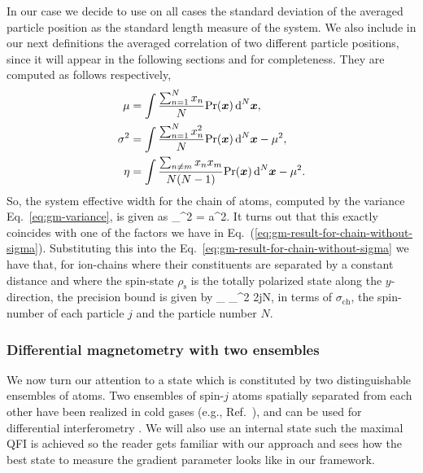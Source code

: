 In our case we decide to use on all cases the standard deviation of the averaged particle position as the standard length measure of the system.
We also include in our next definitions the averaged correlation of two different particle positions, since it will appear in the following sections and for completeness.
They are computed as follows respectively,
\begin{align}
  \mu &= \int \frac{\sum_{n=1}^N x_n}{N} \text{Pr}(\boldsymbol{x}) \, \text{d}^N\boldsymbol{x},
  \label{eq:gm-mean} \\
  \sigma^2 &= \int \frac{\sum_{n=1}^N x_n^2}{N} \text{Pr}(\boldsymbol{x}) \, \text{d}^N\boldsymbol{x}  - \mu^2,
  \label{eq:gm-variance} \\
  \eta & =  \int \frac{\sum_{n\neq m} x_n x_m}{N(N-1)}\text{Pr}(\boldsymbol{x}) \, \text{d}^N\boldsymbol{x} - \mu^2.
  \label{eq:gm-correlation}
\end{align}
So, the system effective width for the chain of atoms, computed by the variance Eq.~\eqref{eq:gm-variance}, is given as
\be
  \sigma_{}^2 = a^2.
  \label{eq:gm-variance-chain}
\ee
It turns out that this exactly coincides with one of the factors we have in Eq.~(\ref{eq:gm-result-for-chain-without-sigma}).
Substituting this into the Eq.~\eqref{eq:gm-result-for-chain-without-sigma} we have that,
for ion-chains where their constituents are separated by a constant distance and where the spin-state $\rho_{\text{s}}$ is the totally polarized state along the $y$-direction, the precision bound is given by
\be
  _{} \leqslant \sigma_{}^2 2jN,
\ee
in terms of $\sigma_{\text{ch}}$, the spin-number of each particle $j$ and the particle number $N$.

\subsubsection{Differential magnetometry with two ensembles}

We now turn our attention to a state which is constituted by two distinguishable ensembles of atoms.
Two ensembles of spin-$j$ atoms spatially separated from each other have been realized in cold gases (e.g., Ref.~\cite{Julsgaard2001}), and can be used for differential interferometry \cite{Eckert2006, Landini2014}.
We will also use an internal state such the maximal QFI is achieved so the reader gets familiar with our approach and sees how the best state to measure the gradient parameter looks like in our framework.

